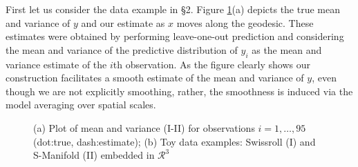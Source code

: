 \documentclass{article}
\begin{document}
First let us consider the data example in \S 2. Figure \ref{fig1}(a) depicts the true mean and variance of $y$ and our estimate as $x$ moves along the geodesic. These estimates were obtained by performing leave-one-out prediction and considering the mean and variance of the predictive distribution of $y_i$ as the mean and variance estimate of the $i$th observation. As the figure clearly shows our construction facilitates a smooth estimate of the mean and variance of $y$, even though we are not explicitly smoothing, rather, the smoothness is induced via the  model averaging over spatial scales.


\begin{figure}
    \centering
    \caption{(a) Plot of mean and variance (I-II) for observations $i=1, \ldots, 95$ (dot:true, dash:estimate); (b) Toy data examples: Swissroll (I) and S-Manifold (II) embedded in $\mathcal{R}^3$}
    \label{fig1}
\end{figure}
%
\end{document}
